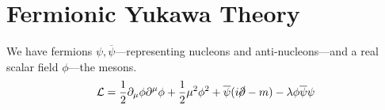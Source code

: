 \section{Fermionic Yukawa Theory}%
\label{sec:fermionic_yukawa_theory}

We have fermions $\psi, \overline{\psi}$---representing nucleons and anti-nucleons---and a real scalar field $\phi$---the mesons.
\begin{equation}
  \mathcal{L} = \frac{1}{2} \partial_{\mu} \phi \partial^{\mu} \phi + \frac{1}{2} \mu^2 \phi^2 + \overline{\psi}(i \cancel{\partial} - m) - \lambda \phi \overline{\psi} \psi
\end{equation}
